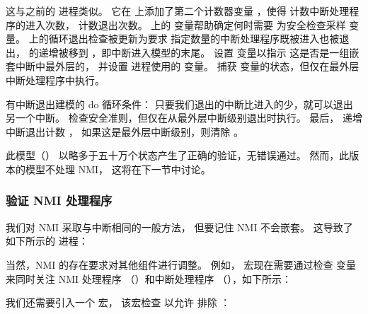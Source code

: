 \begin{fcvref}
这与之前的  进程类似。
它在  上添加了第二个计数器变量 ，使得
 计数中断处理程序的进入次数， 计数退出次数。
 上的  变量帮助确定何时需要
为安全检查采样  变量。
 上的循环退出检查被更新为要求
指定数量的中断处理程序既被进入也被退出，
 的递增被移到 ，即中断进入模型的末尾。
 设置  变量以指示
这是否是一组嵌套中断中最外层的，
并设置  进程使用的
 变量。
 捕获 
变量的状态，但仅在最外层中断处理程序中执行。

 有中断退出建模的 do 循环条件：
只要我们退出的中断比进入的少，就可以退出另一个中断。
检查安全准则，但仅在从最外层中断级别退出时执行。
最后， 递增中断退出计数 ，
如果这是最外层中断级别，则清除 。
\end{fcvref}

此模型（）
以略多于五十万个状态产生了正确的验证，无错误通过。
然而，此版本的模型不处理 NMI，
这将在下一节中讨论。

\subsubsection{验证 NMI 处理程序}
\label{sec:formal:Validating NMI Handlers}

我们对 NMI 采取与中断相同的一般方法，
但要记住 NMI 不会嵌套。
这导致了如下所示的  进程：



当然，NMI 的存在要求对其他组件进行调整。
例如， 宏现在需要通过检查
 变量来同时关注 NMI 处理程序
（）和中断处理程序
（），如下所示：



我们还需要引入一个  宏，
该宏检查  以允许
 排除 ：



